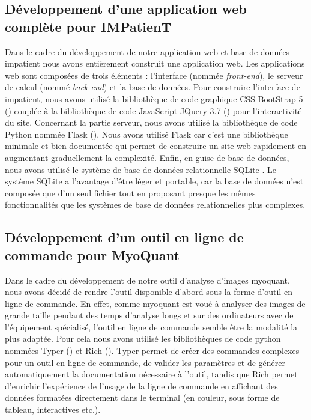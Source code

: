 \subsection{Développement d'une application web complète pour IMPatienT}
Dans le cadre du développement de notre application web et base de données \gls{impatient} nous avons entièrement construit une application web. Les applications web sont composées de trois éléments : l'interface (nommée \textit{front-end}), le serveur de calcul (nommé \textit{back-end}) et la base de données. Pour construire l'interface de \gls{impatient}, nous avons utilisé la bibliothèque de code graphique CSS BootStrap 5 (\cite{mark_otto_bootstrap_2011}) couplée à la bibliothèque de code JavaScript JQuery 3.7 (\cite{resig_jquery_2006}) pour l'interactivité du site. Concernant la partie serveur, nous avons utilisé la bibliothèque de code Python nommée Flask (\cite{ronacher_flask_2010}). Nous avons utilisé Flask car c'est une bibliothèque minimale et bien documentée qui permet de construire un site web rapidement en augmentant graduellement la complexité. Enfin, en guise de base de données, nous avons utilisé le système de base de données relationnelle SQLite \cite{hipp_sqlite_2020}. Le système SQLite a l'avantage d'être léger et portable, car la base de données n'est composée que d'un seul fichier tout en proposant presque les mêmes fonctionnalités que les systèmes de base de données relationnelles plus complexes.

\subsection{Développement d'un outil en ligne de commande pour MyoQuant}
Dans le cadre du développement de notre outil d'analyse d'images \gls{myoquant}, nous avons décidé de rendre l'outil disponible d'abord sous la forme d'outil en ligne de commande. En effet, comme \gls{myoquant} est voué à analyser des images de grande taille pendant des temps d'analyse longs et sur des ordinateurs avec de l'équipement spécialisé, l'outil en ligne de commande semble être la modalité la plus adaptée. Pour cela nous avons utilisé les bibliothèques de code python nommées Typer (\cite{ramirez_typer_2019}) et Rich (\cite{will_mcgugan_rich_2020}). Typer permet de créer des commandes complexes pour un outil en ligne de commande, de valider les paramètres et de générer automatiquement la documentation nécessaire à l'outil, tandis que Rich permet d'enrichir l'expérience de l'usage de la ligne de commande en affichant des données formatées directement dans le terminal (en couleur, sous forme de tableau, interactives etc.).

